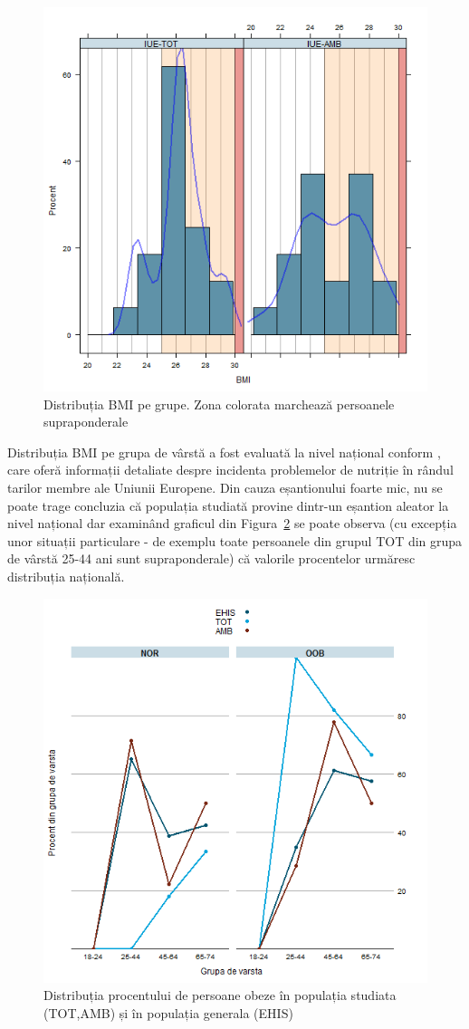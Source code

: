 \documentclass[12pt]{article}
\begin{document}
  \begin{figure}[H]
    \centering
    \includegraphics[width=0.8\linewidth]{totBMIDens}
    \caption{Distribuția \ac{BMI} pe grupe. Zona colorata marchează persoanele supraponderale}
    \label{fig:totBMIDens}
  \end{figure}
  Distribuția \ac{BMI} pe grupa de vârstă a fost evaluată la nivel național conform \citep{EHIS09}, care oferă informații detaliate despre incidenta problemelor de nutriție în rândul tarilor membre ale Uniunii Europene. 
  Din cauza eșantionului foarte mic, nu se poate trage concluzia că populația studiată provine dintr-un eșantion aleator la nivel național dar examinând graficul din Figura~\ref{fig:totBMIvsEHIS-full} se poate observa (cu excepția unor situații particulare - de exemplu toate persoanele din grupul TOT din grupa de vârstă 25-44 ani sunt supraponderale) că valorile procentelor urmăresc distribuția națională.
  \begin{figure}[H]
    \centering
    \includegraphics[width=0.8\linewidth]{totBMIvsEHIS-full}
    \caption{Distribuția procentului de persoane obeze în populația studiata (TOT,AMB) și în populația generala (EHIS) }
    \label{fig:totBMIvsEHIS-full}
  \end{figure}
\end{document}
